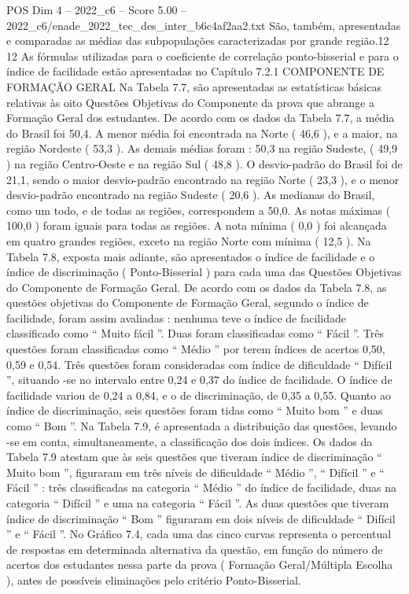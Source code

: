 \begin{textsample}{POS Dim 4 – 2022\_c6 – Score 5.00 – 2022\_c6/enade\_2022\_tec\_des\_inter\_b6c4af2aa2.txt}
São, também, apresentadas e comparadas as médias das subpopulações caracterizadas por grande região.12 12 As fórmulas utilizadas para o coeficiente de correlação ponto-bisserial e para o índice de facilidade estão apresentadas no Capítulo 7.2.1 COMPONENTE DE FORMAÇÃO GERAL Na Tabela 7.7, são apresentadas as estatísticas básicas relativas às oito Questões Objetivas do Componente da prova que abrange a Formação Geral dos estudantes.
De acordo com os dados da Tabela 7.7, a média do Brasil foi 50,4.
A menor média foi encontrada na Norte ( 46,6 ), e a maior, na região Nordeste ( 53,3 ).
As demais médias foram : 50,3 na região Sudeste, ( 49,9 ) na região Centro-Oeste e na região Sul ( 48,8 ).
O desvio-padrão do Brasil foi de 21,1, sendo o maior desvio-padrão encontrado na região Norte ( 23,3 ), e o menor desvio-padrão encontrado na região Sudeste ( 20,6 ).
As medianas do Brasil, como um todo, e de todas as regiões, correspondem a 50,0.
As notas máximas ( 100,0 ) foram iguais para todas as regiões.
A nota mínima ( 0,0 ) foi alcançada em quatro grandes regiões, exceto na região Norte com mínima ( 12,5 ).
Na Tabela 7.8, exposta mais adiante, são apresentados o índice de facilidade e o índice de discriminação ( Ponto-Bisserial ) para cada uma das Questões Objetivas do Componente de Formação Geral.
De acordo com os dados da Tabela 7.8, as questões objetivas do Componente de Formação Geral, segundo o índice de facilidade, foram assim avaliadas : nenhuma teve o índice de facilidade classificado como “ Muito fácil ”.
Duas foram classificadas como “ Fácil ”.
Três questões foram classificadas como “ Médio ” por terem índices de acertos 0,50, 0,59 e 0,54.
Três questões foram consideradas com índice de dificuldade “ Difícil ”, situando -se no intervalo entre 0,24 e 0,37 do índice de facilidade.
O índice de facilidade variou de 0,24 a 0,84, e o de discriminação, de 0,35 a 0,55.
Quanto ao índice de discriminação, seis questões foram tidas como “ Muito bom ” e duas como “ Bom ”.
Na Tabela 7.9, é apresentada a distribuição das questões, levando -se em conta, simultaneamente, a classificação dos dois índices.
Os dados da Tabela 7.9 atestam que às seis questões que tiveram índice de discriminação “ Muito bom ”, figuraram em três níveis de dificuldade “ Médio ”, “ Difícil ” e “ Fácil ” : três classificadas na categoria “ Médio ” do índice de facilidade, duas na categoria “ Difícil ” e uma na categoria “ Fácil ”.
As duas questões que tiveram índice de discriminação “ Bom ” figuraram em dois níveis de dificuldade “ Difícil ” e “ Fácil ”.
No Gráfico 7.4, cada uma das cinco curvas representa o percentual de respostas em determinada alternativa da questão, em função do número de acertos dos estudantes nessa parte da prova ( Formação Geral/Múltipla Escolha ), antes de possíveis eliminações pelo critério Ponto-Bisserial.

\end{textsample}
